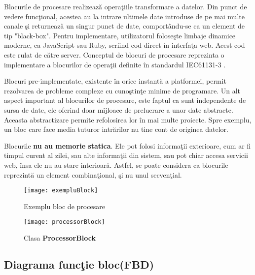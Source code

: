 Blocurile de procesare realizează operaţiile transformare a datelor. Din punct de vedere funcţional, acestea au la intrare ultimele date introduse de pe mai multe canale şi returnează un singur punct de date, comportându-se ca un element de tip "black-box"\autocite{functionBlocks}. Pentru implementare, utilizatorul foloseşte limbaje dinamice moderne, ca JavaScript sau Ruby, scriind cod direct în interfaţa web. Acest cod este rulat de către server. 
Conceptul de blocuri de procesare reprezinta o implementare a blocurilor de operaţii definite în standardul  IEC61131-3 \autocite[Apendix C]{IEC61131-3} .

Blocuri pre-implementate, existente în orice instantă a platformei, permit rezolvarea de probleme complexe cu cunoştinţe minime de programare.
Un alt aspect important al blocurilor de procesare, este faptul ca sunt independente de sursa de date, ele oferind doar mijloace de prelucrare a unor date abstracte. Aceasta abstractizare permite refolosirea lor în mai multe proiecte. Spre exemplu, un bloc care face media tuturor intrărilor nu tine cont de originea datelor. 

Blocurile \textbf{nu au memorie statica}. Ele pot folosi informaţii exterioare, cum ar fi timpul curent al zilei, sau alte informaţii din sistem, sau pot chiar accesa servicii web, însa ele nu au stare interioară. Astfel, se poate considera ca blocurile reprezintă un element combinaţional, şi nu unul secvenţial.
\begin{figure}[H]
	\centering
	\texttt{[image: exempluBlock]}
	\caption{Exemplu bloc de procesare}
\end{figure}

\begin{figure}[H]
	\centering
	\texttt{[image: processorBlock]}
	\caption{Clasa \textbf{ProcessorBlock}}
\end{figure}

\subsection{Diagrama funcţie bloc(FBD)}

